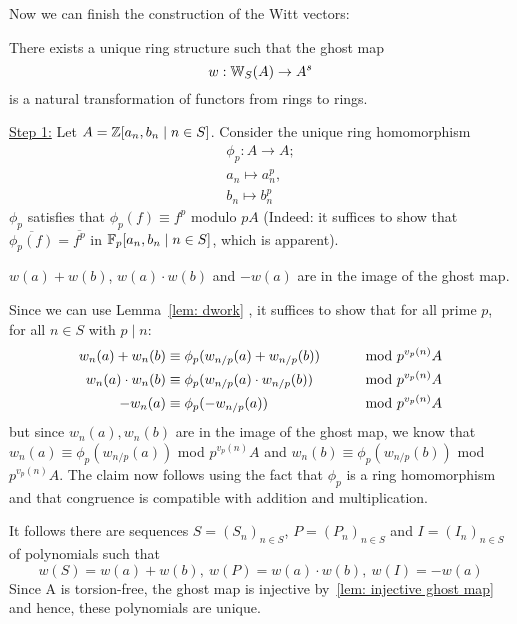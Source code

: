 Now we can finish the construction of the Witt vectors:
\begin{theorem} \label{thm: existence of witt vectors}
    There exists a unique ring structure such that the ghost map 
    \[
      w:\mathbb{W}_S(A) \to A^s  
    \]
    is a natural transformation of functors from rings to rings.
\end{theorem}
\begin{bigproof}
    \underline{Step 1:} Let $A=\mathbb{Z} [a_n,b_n \mid n \in S]$. Consider the unique
    ring homomorphism 
    \begin{align*}
        \phi_p \colon A \to A; \\
        a_n \mapsto a_n^p, \\
        b_n \mapsto b_n^p
    \end{align*}
    $\phi_p$ satisfies that $\phi_p(f) \equiv f^p$ modulo $pA$ (Indeed: it suffices to show that $\overline{\phi_p(f)}
    = \overline{f^p}$ in $\mathbb{F}_p[a_n,b_n \mid n \in S]$, which is apparent). 
    \begin{claim*}
        $w(a)+w(b)$, $w(a) \cdot w(b)$ and $-w(a)$ are in the image of the ghost map.
    \end{claim*}
    \begin{smallproof}
        Since we can use Lemma~\ref{lem: dwork} , it suffices to show that
        for all prime $p$, for all $n \in S$ with $p \mid n$:
        \begin{align*}
           w_n(a)+w_n(b) &\equiv \phi_p(w_{n/p}(a)+w_{n/p}(b)) &\text{\hskip8mm mod } p^{v_p(n)}A \\
           w_n(a)\cdot w_n(b) &\equiv \phi_p(w_{n/p}(a) \cdot w_{n/p}(b)) &\text{\hskip8mm mod } p^{v_p(n)}A \\
           -w_n(a) &\equiv \phi_p(-w_{n/p}(a)) &\text{\hskip8mm mod } p^{v_p(n)}A
        \end{align*} 
        but since $w_n(a), w_n(b)$ are in the image of the ghost map, we know that
        $w_n(a) \equiv \phi_p(w_{n/p}(a))$ mod $p^{v_p(n)}A$ and 
        $w_n(b) \equiv \phi_p(w_{n/p}(b))$ mod $p^{v_p(n)}A$.
        The claim now follows using the fact that $\phi_p$ is a ring homomorphism and 
        that congruence is compatible with addition and multiplication.
        \end{smallproof}
    It follows there are sequences $S = (S_n)_{n \in S}$, $P = (P_n)_{n \in S}$
    and $I = (I_n)_{n \in S}$ of polynomials such that
    \[
        w(S) = w(a) + w(b), \ w(P) = w(a) \cdot w(b), \ w(I) = -w(a)
    \]
    Since A is torsion-free, the ghost map is injective by~\ref{lem: injective ghost map}
    and hence, these polynomials are unique.


\end{bigproof}
